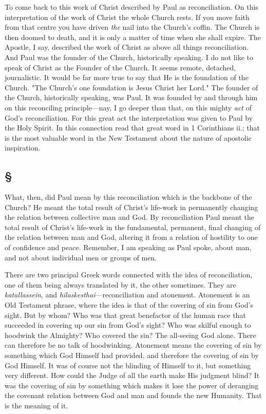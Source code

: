 \documentclass[draft]{ptfdoc}
\begin{document}
To come back to this work of Christ described 
by Paul as reconciliation. On this 
interpretation of the work of Christ the whole 
Church rests. If you move faith from that 
centre you have driven \textit{the} nail into the Church's 
coffin. The Church is then doomed to death, 
and it is only a matter of time when she 
shall expire. The Apostle, I say, described the 
work of Christ as above all things reconciliation. 
And Paul was the founder of the Church, 
historically speaking. I do not like to speak 
of Christ as the Founder of the Church. It 
seems remote, detached, journalistic. It would 
be far more true to say that He is the foundation 
of the Church. "The Church's one foundation 
is Jesus Christ her Lord." The founder 
of the Church, historically speaking, was Paul. 
It was founded by and through him on this 
reconciling principle---nay, I go deeper than 
that, on this mighty \textit{act} of God's reconciliation. 
For this great act the interpretation was 
given to Paul by the Holy Spirit. In this connection 
read that great word in 1 Corinthians ii.; 
that is the most valuable word in the New 
Testament about the nature of apostolic inspiration. 

\subsection*{
\S
}

What, then, did Paul mean by this reconciliation 
which is the backbone of the Church? 
He meant the total result of Christ's life-work 
in permanently changing the relation between 
collective man and God. By reconciliation Paul 
meant the total result of Christ's life-work in 
the fundamental, permanent, final changing of 
the relation between man and God, altering 
it from a relation of hostility to one of confidence 
and peace. Remember, I am speaking 
as Paul spoke, about man, and not about 
individual men or groups of men. 

There are two principal Greek words connected 
with the idea of reconciliation, one of 
them being always translated by it, the other 
sometimes. They are \textit{katallassein}, and \textit{hilaskesthai}---reconciliation 
and atonement. Atonement 
is an Old Testament phrase, where the 
idea is that of the covering of sin from God's 
sight. But by whom? Who was that great 
benefactor of the human race that succeeded in 
covering up our sin from God's sight? Who 
was skilful enough to hoodwink the Almighty? 
Who covered the sin? The all-seeing God 
alone. There can therefore be no talk of hoodwinking. Atonement means the covering of 
sin by something which God Himself had 
provided, and therefore the covering of sin by
God Himself. It was of course not the blinding 
of Himself to it, but something very different. 
How could the Judge of all the earth make 
His judgment blind? It was the covering of 
sin by something which makes it lose the power 
of deranging the covenant relation between 
God and man and founds the new Humanity. 
That is the meaning of it. 
\end{document}
